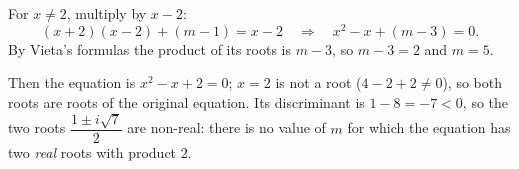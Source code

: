For $x\ne2$, multiply by $x-2$:
\[
(x+2)(x-2)+(m-1)=x-2\quad\Longrightarrow\quad x^2-x+(m-3)=0 .
\]
By Vieta's formulas the product of its roots is $m-3$, so $m-3=2$ and $m=\boxed{5}$.

Then the equation is $x^2-x+2=0$; $x=2$ is not a root ($4-2+2\ne0$), so both roots are roots of the original equation. Its discriminant is $1-8=-7<0$, so the two roots $\dfrac{1\pm i\sqrt7}{2}$ are non-real: there is no value of $m$ for which the equation has two \emph{real} roots with product $2$.
